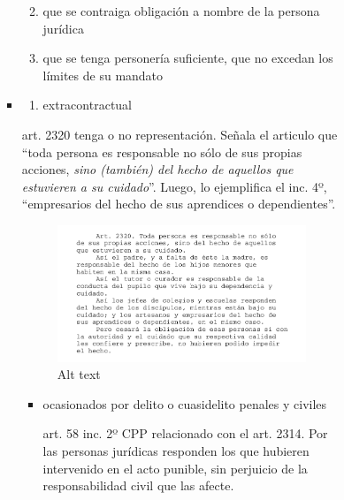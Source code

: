 \documentclass[]{article}
\providecommand{\tightlist}{%
  \setlength{\itemsep}{0pt}\setlength{\parskip}{0pt}}
\begin{document}
\begin{itemize}
\begin{itemize}
\begin{itemize}
\begin{itemize}
\begin{itemize}
\begin{itemize}
            \begin{enumerate}
            \def\labelenumi{\arabic{enumi}.}
            \tightlist
            \item
              que se contraiga obligación a nombre de la persona
              jurídica
            \item
              que se tenga personería suficiente, que no excedan los
              límites de su mandato
            \end{enumerate}
          \item
            \begin{enumerate}
            \def\labelenumi{\alph{enumi})}
            \setcounter{enumi}{1}
            \tightlist
            \item
              extracontractual
            \end{enumerate}

            art. 2320 tenga o no representación. Señala el articulo que
            ``toda persona es responsable no sólo de sus propias
            acciones, \emph{sino (también) del hecho de aquellos que
            estuvieren a su cuidado}''. Luego, lo ejemplifica el inc.
            4º, ``empresarios del hecho de sus aprendices o
            dependientes''.

            \begin{figure}
            \centering
            \includegraphics{2320.png?raw=true}
            \caption{Alt text}
            \end{figure}

            \begin{itemize}
            \item
              ocasionados por delito o cuasidelito penales y civiles

              art. 58 inc. 2º CPP relacionado con el art. 2314. Por las
              personas jurídicas responden los que hubieren intervenido
              en el acto punible, sin perjuicio de la responsabilidad
              civil que las afecte.


\end{itemize}
\end{itemize}
\end{itemize}
\end{itemize}
\end{itemize}
\end{itemize}
\end{itemize}
\end{document}
